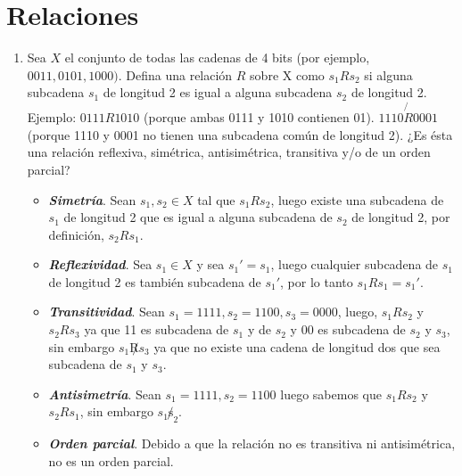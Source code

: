 \documentclass{report}
\begin{document}

    \section*{Relaciones}

    \begin{enumerate}
        \item Sea $X$ el conjunto de todas las cadenas de 4 bits (por ejemplo, $0011,0101,1000)$. Defina una relación $R$ sobre $\mathrm{X}$ como $s_1 R s_2$ si alguna subcadena $s_1$ de longitud 2 es igual a alguna subcadena $s_2$ de longitud 2. Ejemplo: $0111 R 1010$ (porque ambas 0111 y 1010 contienen 01). $1110 \not{R} 0001$ (porque 1110 y 0001 no tienen una subcadena común de longitud 2). ¿Es ésta una relación reflexiva, simétrica, antisimétrica, transitiva y/o de un orden parcial?

        \begin{itemize}
            \item \textit{\textbf{Simetría}}. Sean $s_1, s_2 \in X$ tal que $s_1 R s_2$, luego existe una subcadena de $s_1$ de longitud 2 que es igual a alguna subcadena de $s_2$ de longitud 2, por definición, $s_2 R s_1$.
            \item \textit{\textbf{Reflexividad}}. Sea $s_1 \in X$ y sea $s_1' = s_1$, luego cualquier subcadena de $s_1$ de longitud 2 es también subcadena de $s_1'$, por lo tanto $s_1 R s_1 = s_1'$.
            \item \textit{\textbf{Transitividad}}. Sean $s_1 = 1111, s_2 = 1100, s_3 = 0000$, luego, $s_1 R s_2$ y $s_2 R s_3$ ya que 11 es subcadena de $s_1$ y de $s_2$ y 00 es subcadena de $s_2$ y $s_3$, sin embargo $s_1 \not R s_3$ ya que no existe una cadena de longitud dos que sea subcadena de $s_1$ y $s_3$.
            \item \textit{\textbf{Antisimetría}}. Sean $s_1 = 1111, s_2 = 1100$ luego sabemos que $s_1 R s_2$ y $s_2 R s_1$, sin embargo $s_1 \not s_2$.
            \item \textit{\textbf{Orden parcial}}. Debido a que la relación no es transitiva ni antisimétrica, no es un orden parcial.
        \end{itemize}
    \end{enumerate}
\end{document}
